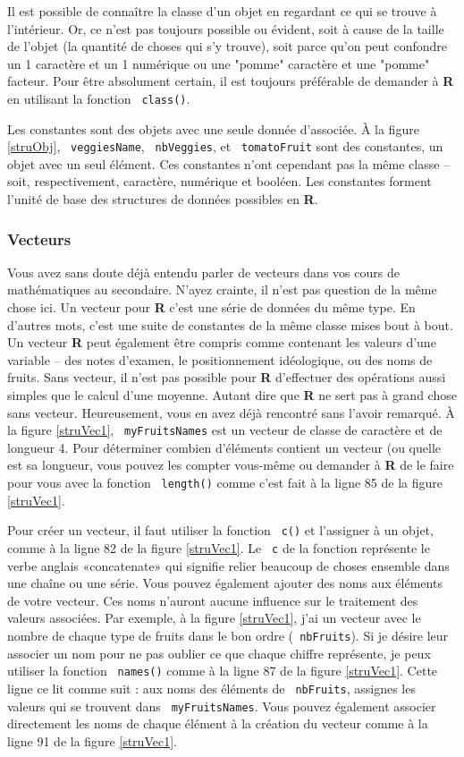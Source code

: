 \documentclass[10.5pt,a4paper]{article}
\newcommand{\rcode}[1]{\texttt{\color{rstudio} #1}}
\begin{document}
    Il est possible de connaître la classe d'un objet en regardant ce qui se trouve à l'intérieur. Or, ce n'est pas toujours possible ou évident, soit à cause de la taille de l'objet (la quantité de choses qui s'y trouve), soit parce qu'on peut confondre un 1 caractère et un 1 numérique ou une "pomme" caractère et une "pomme" facteur. Pour être absolument certain, il est toujours préférable de demander à \textbf{R} en utilisant la fonction \rcode{class()}.
    
    Les constantes sont des objets avec une seule donnée d'associée. À la figure \ref{struObj}, \rcode{veggiesName}, \rcode{nbVeggies}, et \rcode{tomatoFruit} sont des constantes, un objet avec un seul élément. Ces constantes n'ont cependant pas la même classe -- soit, respectivement, caractère, numérique et booléen. Les constantes forment l'unité de base des structures de données possibles en \textbf{R}.
    
    \subsubsection{Vecteurs}\label{vec}
    Vous avez sans doute déjà entendu parler de vecteurs dans vos cours de mathématiques au secondaire. N'ayez crainte, il n'est pas question de la même chose ici. Un vecteur pour \textbf{R} c'est une série de données du même type. En d'autres mots, c'est une suite de constantes de la même classe mises bout à bout. Un vecteur \textbf{R} peut également être compris comme contenant les valeurs d'une variable -- des notes d'examen, le positionnement idéologique, ou des noms de fruits. Sans vecteur, il n'est pas possible pour \textbf{R} d'effectuer des opérations aussi simples que le calcul d'une moyenne. Autant dire que \textbf{R} ne sert pas à grand chose sans vecteur. Heureusement, vous en avez déjà rencontré sans l'avoir remarqué. À la figure \ref{struVec1}, \rcode{myFruitsNames} est un vecteur de classe de caractère et de longueur 4. Pour déterminer combien d'éléments contient un vecteur (ou quelle est sa longueur, vous pouvez les compter vous-même ou demander à \textbf{R} de le faire pour vous avec la fonction \rcode{length()} comme c'est fait à la ligne 85 de la figure \ref{struVec1}. 
    
    Pour créer un vecteur, il faut utiliser la fonction \rcode{c()} et l'assigner à un objet, comme à la ligne 82 de la figure \ref{struVec1}. Le \rcode{c} de la fonction représente le verbe anglais «concatenate» qui signifie relier beaucoup de choses ensemble dans une chaîne ou une série. Vous pouvez également ajouter des noms aux éléments de votre vecteur. Ces noms n'auront aucune influence sur le traitement des valeurs associées. Par exemple, à la figure \ref{struVec1}, j'ai un vecteur avec le nombre de chaque type de fruits dans le bon ordre (\rcode{nbFruits}). Si je désire leur associer un nom pour ne pas oublier ce que chaque chiffre représente, je peux utiliser la fonction \rcode{names()} comme à la ligne 87 de la figure \ref{struVec1}. Cette ligne ce lit comme suit : aux noms des éléments de \rcode{nbFruits}, assignes les valeurs qui se trouvent dans \rcode{myFruitsNames}. Vous pouvez également associer directement les noms de chaque élément à la création du vecteur comme à la ligne 91 de la figure \ref{struVec1}. 
    
\end{document}
